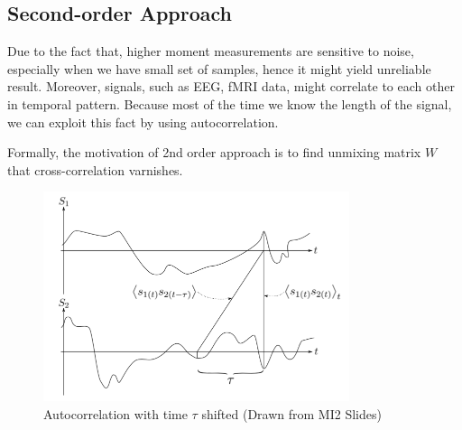 \subsection{Second-order Approach}
Due to the fact that, higher moment measurements are sensitive to noise, especially when we have small set of samples, hence it might yield unreliable result. Moreover, signals, such as EEG, fMRI data, might correlate to each other in temporal pattern. Because most of the time we know the length of the signal, we can exploit this fact by using autocorrelation.


Formally, the motivation of 2nd order approach is to find unmixing matrix $W$ that cross-correlation varnishes.
\begin{figure}[hbt]
	\center
  \includegraphics[width=0.8\textwidth]{figures/ica-autocorrelation}
  \caption{Autocorrelation with time $\tau$ shifted (Drawn from MI2 Slides)}
  \label{fig:ica-autocorrelation}
\end{figure}


